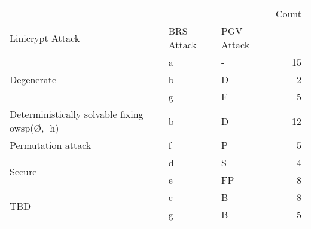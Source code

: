\begin{tabular}{lllr}
 &  &  & Count \\
Linicrypt Attack & BRS Attack & PGV Attack &  \\
\multirow[c]{3}{*}{Degenerate} & a & - & 15 \\
 & b & D & 2 \\
 & g & F & 5 \\
Deterministically solvable fixing 
owsp(\O, h) & b & D & 12 \\
Permutation attack & f & P & 5 \\
\multirow[c]{2}{*}{Secure} & d & S & 4 \\
 & e & FP & 8 \\
\multirow[c]{2}{*}{TBD} & c & B & 8 \\
 & g & B & 5 \\
\end{tabular}
